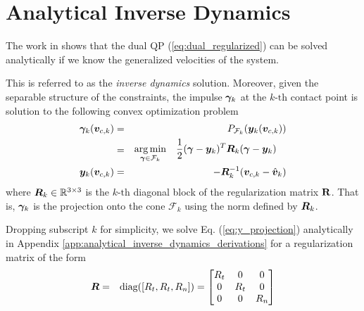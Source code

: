 \section{Analytical Inverse Dynamics}
\label{sec:analytical_inverse_dynamics}

The work in \cite{bib:todorov2014} shows that the dual QP
(\ref{eq:dual_regularized}) can be solved analytically if we know the
generalized velocities of the system.

This is referred to as the \textit{inverse dynamics} solution.
Moreover, given the separable structure of the constraints, the impulse
${\bm\gamma}_k$ at the $k\text{-th}$ contact point is solution to the following
convex optimization problem
\begin{eqnarray}
	\bgamma_k(\vf{v}_{c,k})&=& P_{\mathcal{F}_k}(\vf{y}_k(\vf{v}_{c,k})) \nonumber\\
	&=&\begin{aligned}
		\argmin_{\bgamma\in\mathcal{F}_k} \quad &
	\frac{1}{2}(\bgamma-\vf{y}_k)^T\vf{R}_k(\bgamma-\vf{y}_k) \end{aligned}
    \label{eq:y_projection}\\
	\vf{y}_k(\vf{v}_{c,k}) &=& -\vf{R}_k^{-1}(\vf{v}_{c,k}-\hat{\vf{v}}_k)    
\end{eqnarray}
where ${\bm{R}}_k\in\mathbb{R}^{3\times3}$ is the $k\text{-th}$ diagonal block of
the regularization matrix ${\mathbf{R}}$. That is, ${\bm\gamma}_k$ is the projection onto
the cone $\mathcal{F}_k$ using the norm defined by ${\bm{R}}_k$.

Dropping subscript $k$ for simplicity, we solve Eq. (\ref{eq:y_projection})
analytically in Appendix \ref{app:analytical_inverse_dynamics_derivations} for a
regularization matrix of the form
\begin{eqnarray}	
	\vf{R} &=& \text{diag}([R_t, R_t, R_n]) = 
	\begin{bmatrix}
		R_t &   0 & 0\\
		  0 & R_t & 0\\
		  0 &   0 & R_n
	\end{bmatrix}
    \label{eq:Rk}
\end{eqnarray} 

